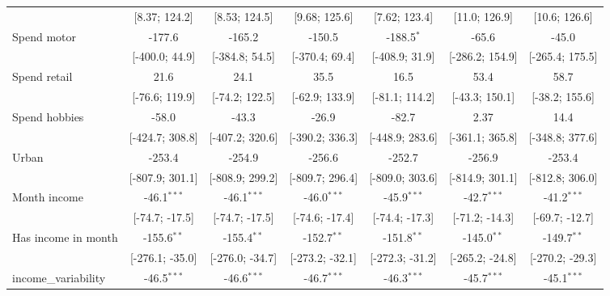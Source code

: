 \begin{table}[htbp]
\begin{threeparttable}[b]
\begin{tabular}{lcccccc}
                                   & [8.37; 124.2]    & [8.53; 124.5]    & [9.68; 125.6]    & [7.62; 123.4]    & [11.0; 126.9]    & [10.6; 126.6]\\   
         Spend motor               & -177.6           & -165.2           & -150.5           & -188.5$^{*}$     & -65.6            & -45.0\\   
                                   & [-400.0; 44.9]   & [-384.8; 54.5]   & [-370.4; 69.4]   & [-408.9; 31.9]   & [-286.2; 154.9]  & [-265.4; 175.5]\\   
         Spend retail              & 21.6             & 24.1             & 35.5             & 16.5             & 53.4             & 58.7\\   
                                   & [-76.6; 119.9]   & [-74.2; 122.5]   & [-62.9; 133.9]   & [-81.1; 114.2]   & [-43.3; 150.1]   & [-38.2; 155.6]\\   
         Spend hobbies             & -58.0            & -43.3            & -26.9            & -82.7            & 2.37             & 14.4\\   
                                   & [-424.7; 308.8]  & [-407.2; 320.6]  & [-390.2; 336.3]  & [-448.9; 283.6]  & [-361.1; 365.8]  & [-348.8; 377.6]\\   
         Urban                     & -253.4           & -254.9           & -256.6           & -252.7           & -256.9           & -253.4\\   
                                   & [-807.9; 301.1]  & [-808.9; 299.2]  & [-809.7; 296.4]  & [-809.0; 303.6]  & [-814.9; 301.1]  & [-812.8; 306.0]\\   
         Month income              & -46.1$^{***}$    & -46.1$^{***}$    & -46.0$^{***}$    & -45.9$^{***}$    & -42.7$^{***}$    & -41.2$^{***}$\\   
                                   & [-74.7; -17.5]   & [-74.7; -17.5]   & [-74.6; -17.4]   & [-74.4; -17.3]   & [-71.2; -14.3]   & [-69.7; -12.7]\\   
         Has income in month       & -155.6$^{**}$    & -155.4$^{**}$    & -152.7$^{**}$    & -151.8$^{**}$    & -145.0$^{**}$    & -149.7$^{**}$\\   
                                   & [-276.1; -35.0]  & [-276.0; -34.7]  & [-273.2; -32.1]  & [-272.3; -31.2]  & [-265.2; -24.8]  & [-270.2; -29.3]\\   
         income\_variability       & -46.5$^{***}$    & -46.6$^{***}$    & -46.7$^{***}$    & -46.3$^{***}$    & -45.7$^{***}$    & -45.1$^{***}$\\   

\end{tabular}
\end{threeparttable}
\end{table}
